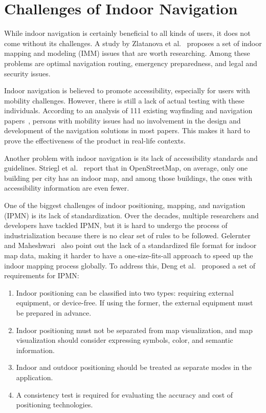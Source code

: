\section{Challenges of Indoor Navigation}\label{sec:2.5}

While indoor navigation is certainly beneficial to all kinds of users, it does
not come without its challenges. A study by Zlatanova et al.~\cite{ref15}
proposes a set of indoor mapping and modeling (IMM) issues that are worth
researching. Among these problems are optimal navigation routing, emergency
preparedness, and legal and security issues.

Indoor navigation is believed to promote accessibility, especially for users
with mobility challenges. However, there is still a lack of actual testing with
these individuals. According to an analysis of 111 existing wayfinding and
navigation papers~\cite{ref16}, persons with mobility issues had no involvement
in the design and development of the navigation solutions in most papers. This
makes it hard to prove the effectiveness of the product in real-life contexts.

Another problem with indoor navigation is its lack of accessibility standards
and guidelines. Striegl et al.~\cite{ref17} report that in OpenStreetMap, on
average, only one building per city has an indoor map, and among those
buildings, the ones with accessibility information are even fewer.

One of the biggest challenges of indoor positioning, mapping, and navigation
(IPMN) is its lack of standardization. Over the decades, multiple researchers
and developers have tackled IPMN, but it is hard to undergo the process of
industrialization because there is no clear set of rules to be followed.
Gelernter and Maheshwari~\cite{ref18} also point out the lack of a standardized
file format for indoor map data, making it harder to have a one-size-fits-all
approach to speed up the indoor mapping process globally. To address this, Deng
et al.~\cite{ref19} proposed a set of requirements for IPMN:

\begin{enumerate}
\def\labelenumi{\arabic{enumi}.}
\item
  Indoor positioning can be classified into two types: requiring external
  equipment, or device-free. If using the former, the external equipment must be
  prepared in advance.
\item
  Indoor positioning must not be separated from map visualization, and map
  visualization should consider expressing symbols, color, and semantic
  information.
\item
  Indoor and outdoor positioning should be treated as separate modes in the
  application.
\item
  A consistency test is required for evaluating the accuracy and cost of
  positioning technologies.
\end{enumerate}
